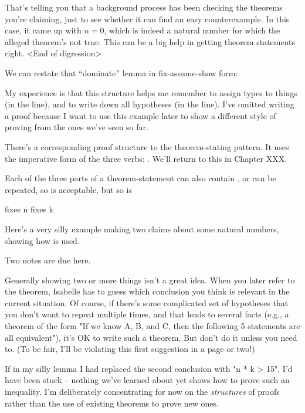 That's telling you that a background process has been checking the theorems you're claiming, just to see whether it can find an easy counterexample. In this case, it came up with $n = 0$, which is indeed a natural number for which the alleged theorem's not true. This can be a big help in getting theorem statements right. <End of digression>

We can restate that ``dominate'' lemma in fix-assume-show form:

My experience is that this structure helps me remember to assign types to things (in the  line), and to write down all hypotheses (in the  line). I've omitted writing a proof because I want to use this example later to show a different style of proving from the ones we've seen so far. 

There's a corresponding proof structure to the theorem-stating  pattern. It uses the imperative form of the three verbs: . We'll return to this in Chapter XXX.

Each of the three parts of a  theorem-statement can also contain , or can be repeated, so  is acceptable, but so is 
\begin{IS}
  fixes n 
  fixes k    
\end{IS}

Here's a very silly example making two claims about some natural numbers, showing how 
 is used. 



Two notes are due here.

Generally showing two or more things isn't a great idea. When you later refer to the theorem, Isabelle has to guess which conclusion you think is relevant in the current situation. Of course, if there's some complicated set of hypotheses that you don't want to repeat multiple times, and that leads to several facts (e.g., a theorem of the form "If we know A, B, and C, then the following 5 statements are all equivalent"), it's OK to write such a theorem. But don't do it unless you need to. (To be fair, I'll be violating this first suggestion in a page or two!)

If in my silly lemma I had replaced the second conclusion with "n * k > 15", I'd have been stuck -- nothing we've learned about yet shows how to prove such an inequality. I'm deliberately concentrating for now on the \textit{structures} of proofs rather than the use of existing theorems to prove new ones. 

